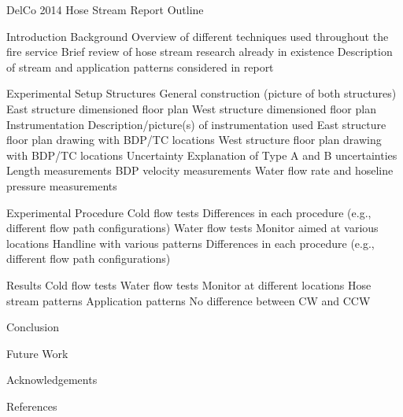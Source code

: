 \documentclass{article}
\begin{document}
DelCo 2014 Hose Stream Report Outline\\

\begin{outline}[enumerate]
\1 Introduction 
	\2 Background
		\3 Overview of different techniques used throughout the fire service
		\3 Brief review of hose stream research already in existence
	\2 Description of stream and application patterns considered in report

\1 Experimental Setup
	\2 Structures
		\3 General construction (picture of both structures)
		\3 East structure dimensioned floor plan
		\3 West structure dimensioned floor plan 
	\2 Instrumentation
		\3 Description/picture(s) of instrumentation used
		\3 East structure floor plan drawing with BDP/TC locations
		\3 West structure floor plan drawing with BDP/TC locations
	\2 Uncertainty
		\3 Explanation of Type A and B uncertainties
		\3 Length measurements
		\3 BDP velocity measurements
		\3 Water flow rate and hoseline pressure measurements

\1 Experimental Procedure
	\2 Cold flow tests
		\3 Differences in each procedure (e.g., different flow path configurations)
	\2 Water flow tests
		\3 Monitor aimed at various locations
		\3 Handline with various patterns
		\3 Differences in each procedure (e.g., different flow path configurations)
		
\1 Results
	\2 Cold flow tests
	\2 Water flow tests
		\3 Monitor at different locations
		\3 Hose stream patterns
		\3 Application patterns
			\4 No difference between CW and CCW

\1 Conclusion

\1 Future Work

\1 Acknowledgements

\1 References

\end{outline}
\end{document}
